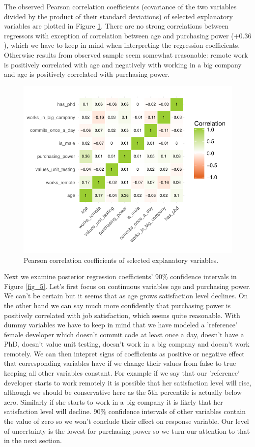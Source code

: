 \documentclass{article}
\begin{document}
The observed Pearson correlation coefficients (covariance of the two variables divided by the product of their standard deviations) of selected explanatory variables are plotted in Figure \ref{fig_4}. There are no strong correlations between regressors with exception of correlation between age and purchasing power ($+0.36$), which we have to keep in mind when interpreting the regression coefficients. Otherwise results from observed sample seem somewhat reasonable: remote work is positively correlated with age and negatively with working in a big company and age is positively correlated with purchasing power.


\begin{figure}[H]
\centering
\includegraphics{report-019}
\caption{Pearson correlation coefficients of selected explanatory variables.}\label{fig_4}
\end{figure}

Next we examine posterior regression coefficients' 90\% confidence intervals in Figure \ref{fig_5}. Let's first focus on continuous variables age and purchasing power. We can't be certain but it seems that as age grows satisfaction level declines. On the other hand we can say much more confidently that purchasing power is positively correlated with job satisfaction, which seems quite reasonable. With dummy variables we have to keep in mind that we have modeled a 'reference' female developer which doesn't commit code at least once a day, doesn't have a PhD, doesn't value unit testing, doesn't work in a big company and doesn't work remotely. We can then intepret signs of coefficients as positive or negative effect that corresponding variables have if we change their values from false to true keeping all other variables constant. For example if we say that our 'reference' developer starts to work remotely it is possible that her satisfaction level will rise, although we should be conservative here as the 5th percentile is actually below zero. Similarly if she starts to work in a big company it is likely that her satisfaction level will decline. 90\% confidence intervals of other variables contain the value of zero so we won't conclude their effect on response variable. Our level of uncertainty is the lowest for purchasing power so we turn our attention to that in the next section.
\end{document}
